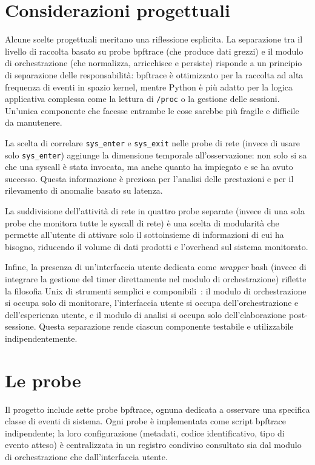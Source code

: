 \section{Considerazioni progettuali}

Alcune scelte progettuali meritano una riflessione esplicita. La separazione tra il livello di raccolta basato su probe bpftrace (che produce dati grezzi) e il modulo di orchestrazione (che normalizza, arricchisce e persiste) risponde a un principio di separazione delle responsabilità: bpftrace è ottimizzato per la raccolta ad alta frequenza di eventi in spazio kernel, mentre Python è più adatto per la logica applicativa complessa come la lettura di \texttt{/proc} o la gestione delle sessioni. Un'unica componente che facesse entrambe le cose sarebbe più fragile e difficile da manutenere.

La scelta di correlare \texttt{sys\_enter} e \texttt{sys\_exit} nelle probe di rete (invece di usare solo \texttt{sys\_enter}) aggiunge la dimensione temporale all'osservazione: non solo si sa che una syscall è stata invocata, ma anche quanto ha impiegato e se ha avuto successo. Questa informazione è preziosa per l'analisi delle prestazioni e per il rilevamento di anomalie basato su latenza.

La suddivisione dell'attività di rete in quattro probe separate (invece di una sola probe che monitora tutte le syscall di rete) è una scelta di modularità che permette all'utente di attivare solo il sottoinsieme di informazioni di cui ha bisogno, riducendo il volume di dati prodotti e l'overhead sul sistema monitorato.

Infine, la presenza di un'interfaccia utente dedicata come \textit{wrapper} bash (invece di integrare la gestione del timer direttamente nel modulo di orchestrazione) riflette la filosofia Unix di strumenti semplici e componibili~\cite{unix_philosophy}: il modulo di orchestrazione si occupa solo di monitorare, l'interfaccia utente si occupa dell'orchestrazione e dell'esperienza utente, e il modulo di analisi si occupa solo dell'elaborazione post-sessione. Questa separazione rende ciascun componente testabile e utilizzabile indipendentemente.


\section{Le probe}

Il progetto include sette probe bpftrace, ognuna dedicata a osservare una specifica classe di eventi di sistema. Ogni probe è implementata come script bpftrace indipendente; la loro configurazione (metadati, codice identificativo, tipo di evento atteso) è centralizzata in un registro condiviso consultato sia dal modulo di orchestrazione che dall'interfaccia utente.

